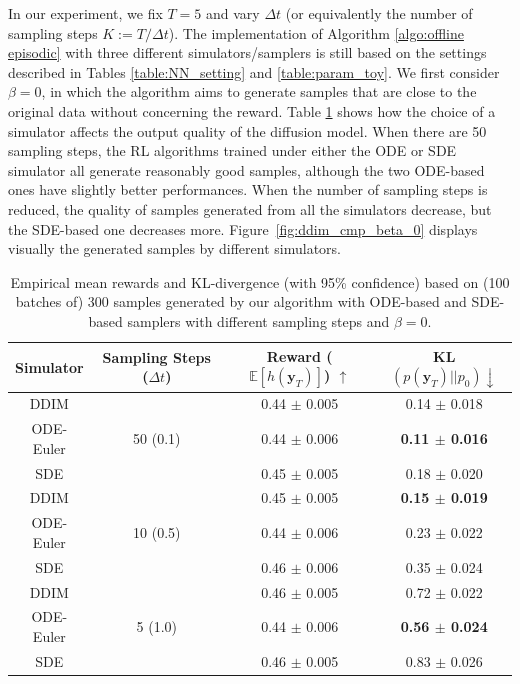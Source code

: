 \documentclass[11pt]{article}
\begin{document}
In our  experiment,  we fix $T=5$ and vary $\Delta t$ (or equivalently the number of sampling steps $K := T/\Delta t$). The implementation of
Algorithm \ref{algo:offline episodic} with three different simulators/samplers is still based on the settings described in Tables \ref{table:NN_setting} and \ref{table:param_toy}. 
We first consider $\beta=0$, in which the algorithm aims to generate samples that are close to the original data without concerning the reward.
Table \ref{table:ode_cmp_beta_0} shows how the choice of a simulator  affects the output quality of the diffusion model. When there are 50 sampling steps, the RL algorithms trained under either the ODE or SDE simulator all generate reasonably good samples, although the two ODE-based ones have slightly better performances.  When the number of sampling steps is reduced, the quality of samples generated from all the simulators decrease, but the SDE-based one decreases more. 
Figure~\ref{fig:ddim_cmp_beta_0} displays visually the generated samples by different simulators.




\begin{table}[h]
    \centering
    \begin{tabular}{c | c | c c}
        \hline Simulator & Sampling Steps ($\Delta t$)& Reward ($\mathbb{E}[h(\mathbf{y}_T)]$) $\uparrow$ & KL$(p(\mathbf{y}_T) || p_0) \downarrow$ \\\hline
	DDIM & \multirow{3}{*}{50 (0.1)} & 0.44 $\pm$ 0.005 &  0.14 $\pm$ 0.018 \\	
	ODE-Euler & & 0.44 $\pm$ 0.006 &  \textbf{0.11 $\pm$ 0.016}  \\	
	SDE &   & 0.45 $\pm$ 0.005 & 0.18 $\pm$ 0.020 \\ \hline\hline
	DDIM & \multirow{3}{*}{10 (0.5)} & 0.45 $\pm$ 0.005 & \textbf{0.15 $\pm$ 0.019} \\		
	ODE-Euler & & 0.44 $\pm$ 0.006 & 0.23 $\pm$ 0.022 \\		
	SDE & & 0.46 $\pm$ 0.006 & 0.35 $\pm$ 0.024 \\\hline\hline
	DDIM & \multirow{3}{*}{5 (1.0)} & 0.46 $\pm$ 0.005 & 0.72 $\pm$ 0.022  \\	
	ODE-Euler & & 0.44 $\pm$ 0.006 & \textbf{0.56 $\pm$ 0.024}  \\	
	SDE & & 0.46 $\pm$ 0.005 & 0.83 $\pm$ 0.026  \\\hline
    \end{tabular}
\caption{Empirical mean rewards and KL-divergence (with 95\% confidence) based on (100 batches of) 300 samples generated by our algorithm with ODE-based and SDE-based samplers with different sampling steps and $\beta = 0$.}
\label{table:ode_cmp_beta_0}
\end{table}
\end{document}
